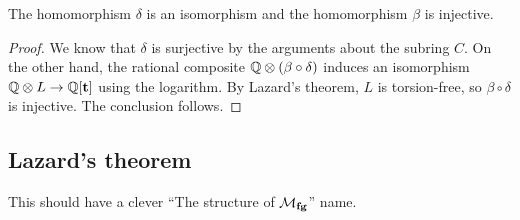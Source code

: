 \begin{theorem}
The homomorphism $\delta$ is an isomorphism and the homomorphism $\beta$ is injective.
\end{theorem}
\begin{proof}
We know that $\delta$ is surjective by the arguments about the subring $C$.  On the other hand, the rational composite $\mathbb{Q} \otimes (\beta \circ \delta)$ induces an isomorphism $\mathbb{Q} \otimes L \to \mathbb{Q}[\mathbf t]$ using the logarithm.  By Lazard's theorem, $L$ is torsion-free, so $\beta \circ \delta$ is injective.  The conclusion follows.
\end{proof}


\subsection*{Lazard's theorem}

This should have a clever ``The structure of $\mathcal{M}_{\mathbf{fg}}$'' name.
